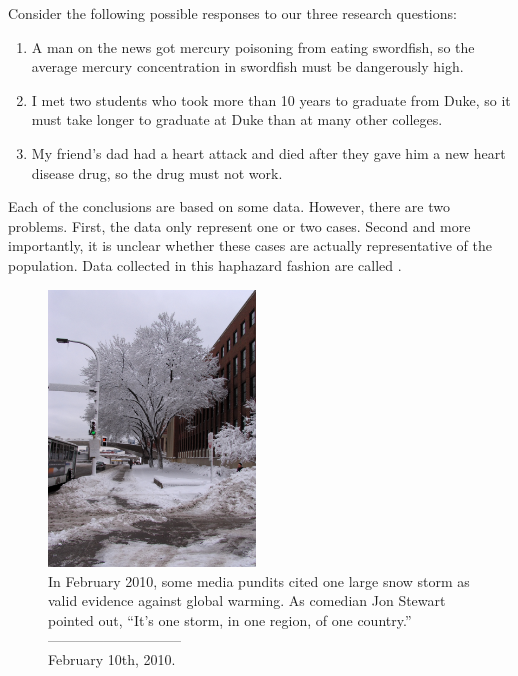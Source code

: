 Consider the following possible responses to our three research questions:
\begin{enumerate}
\item A man on the news got mercury poisoning from eating swordfish, so the average mercury concentration in swordfish must be dangerously high.
\item\label{iKnowThreeStudentsWhoTookMoreThan10YearsToGraduateAtUCLA} I met two students who took more than 10 years to graduate from Duke, so it must take longer to graduate at Duke than at many other colleges.
\item\label{myFriendsDadDiedAfterSulphinpyrazon} My friend's dad had a heart attack and died after they gave him a new heart disease drug, so the drug must not work.
\end{enumerate}
Each of the conclusions are based on some data. However, there are two problems. First, the data only represent one or two cases. Second and more importantly, it is unclear whether these cases are actually representative of the population. Data collected in this haphazard fashion are called .
\setlength{\captionwidth}{\textwidth-80mm}
\begin{figure}
\begin{centering}
\hspace{8mm}\includegraphics[width=55mm]{01/figures/mnWinter/mnWinter}\hspace{4mm}
\begin{minipage}[b]{\textwidth - 80mm}
   \caption[anecdotal evidence]{In February 2010, some media pundits cited one large snow storm as valid evidence against global warming. As comedian Jon Stewart pointed out, ``It's one storm, in one region, of one country.''\vspace{-4.5mm} \\
   
   -----------------------------\vspace{-2mm}\\
   {\footnotesize February 10th, 2010.}
   \label{mnWinter}}
\end{minipage}
\end{centering}
\end{figure}
\setlength{\captionwidth}{\mycaptionwidth}

